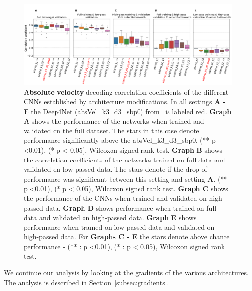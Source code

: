 \begin{itemize}
\begin{figure}
   \includegraphics[width=1\linewidth]{img/ch4/original_setting_absVel_performance_comparison}
\caption[Non-shifted causal prediction - absolute velocity performances ]{\textbf{Absolute velocity} decoding correlation coefficients of the different CNNs established by architecture modifications. In all settings \textbf{
   A - E} the Deep4Net (absVel\_k3\_d3\_sbp0) from~\cite{Hammer-2021} is labeled red. \textbf{Graph A} shows the performance of the networks when trained and validated on the full dataset. The stars in this case denote performance significantly above the absVel\_k3\_d3\_sbp0. (** p <0.01), (* p < 0.05), Wilcoxon signed rank test.
   \textbf{Graph B} shows the correlation coefficients of the networks trained on full data and validated on low-passed data. 
   The stars denote if the drop of performance was significant between this setting and setting \textbf{A}. (** p <0.01), (* p < 0.05), Wilcoxon signed rank test.
   \textbf{Graph C} shows the performance of the CNNs when trained and validated on high-passed data. \textbf{Graph D} shows performance when trained on full data and validated on high-passed data. \textbf{Graph E} shows performance when trained on low-passed data and validated on high-passed data. For \textbf{Graphs C - E} the stars denote above chance performance - (** : p <0.01), (* : p < 0.05), Wilcoxon signed rank test.}
   \label{fig:original-performances-absolute-velocity}
\end{figure}


\end{itemize}

We continue our analysis by looking at the gradients of the various architectures.
The analysis is described in Section~\ref{subsec:gradients}.

